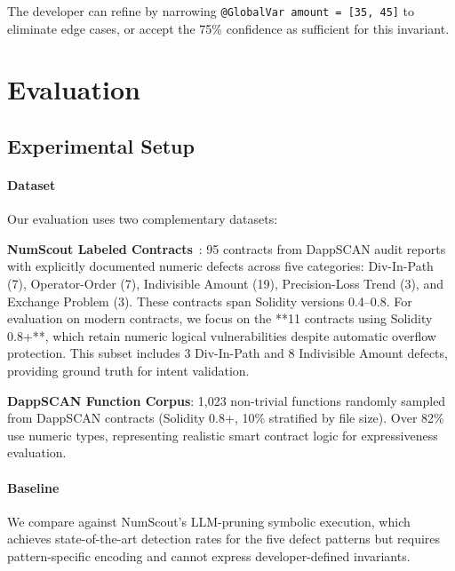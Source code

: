 \documentclass[pdflatex,sn-basic]{sn-jnl}%
\theoremstyle{thmstyleone}%
\theoremstyle{thmstyletwo}%
\theoremstyle{thmstylethree}%
\begin{document}
The developer can refine by narrowing \texttt{@GlobalVar amount = [35, 45]} to eliminate edge cases, or accept the 75\% confidence as sufficient for this invariant.


\section{Evaluation}

\subsection{Experimental Setup}

\paragraph{Dataset}
Our evaluation uses two complementary datasets:

\textbf{NumScout Labeled Contracts}~\citep{numscout}: 95 contracts from DappSCAN audit reports with explicitly documented numeric defects across five categories: Div-In-Path (7), Operator-Order (7), Indivisible Amount (19), Precision-Loss Trend (3), and Exchange Problem (3). These contracts span Solidity versions 0.4--0.8. For evaluation on modern contracts, we focus on the **11 contracts using Solidity 0.8+**, which retain numeric logical vulnerabilities despite automatic overflow protection. This subset includes 3 Div-In-Path and 8 Indivisible Amount defects, providing ground truth for intent validation.

\textbf{DappSCAN Function Corpus}: 1,023 non-trivial functions randomly sampled from DappSCAN contracts (Solidity 0.8+, 10\% stratified by file size). Over 82\% use numeric types, representing realistic smart contract logic for expressiveness evaluation.

\paragraph{Baseline}
We compare against NumScout's LLM-pruning symbolic execution, which achieves state-of-the-art detection rates for the five defect patterns but requires pattern-specific encoding and cannot express developer-defined invariants.
\end{document}
